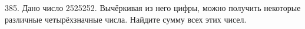385. Дано число 2525252. Вычёркивая из него цифры, можно получить некоторые различные четырёхзначные числа. Найдите сумму всех этих чисел.\\
